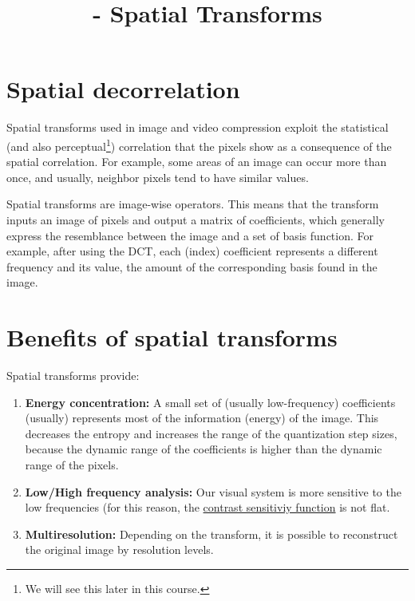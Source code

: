 
\title{\SM{} - Spatial Transforms}

\maketitle

\tableofcontents

\section{Spatial decorrelation}

Spatial transforms used in image and video compression exploit the
statistical (and also perceptual\footnote{We will see this later in
this course.}) correlation that the pixels show as a consequence of
the spatial correlation. For example, some areas of an image can occur
more than once, and usually, neighbor pixels tend to have similar
values.

Spatial transforms are image-wise operators. This means that the
transform inputs an image of pixels and output a matrix of
coefficients, which generally express the resemblance between the
image and a set of basis function. For example, after using the DCT,
each (index) coefficient represents a different frequency and its
value, the amount of the corresponding basis found in the image.

\section{Benefits of spatial transforms}

Spatial transforms provide:
\begin{enumerate}
\item \textbf{Energy concentration:} A small set of (usually low-frequency) coefficients (usually) represents most of the information (energy) of the image. This decreases the entropy and increases the range of the quantization step sizes, because the dynamic range of the coefficients is higher than the dynamic range of the pixels.
\item \textbf{Low/High frequency analysis:} Our visual system is more sensitive to the low frequencies (for this reason, the \href{https://en.wikipedia.org/wiki/Contrast_(vision)#Contrast_sensitivity}{contrast sensitiviy function} is not flat.
\item \textbf{Multiresolution:} Depending on the transform, it is possible to reconstruct the original image by resolution levels.
\end{enumerate}

